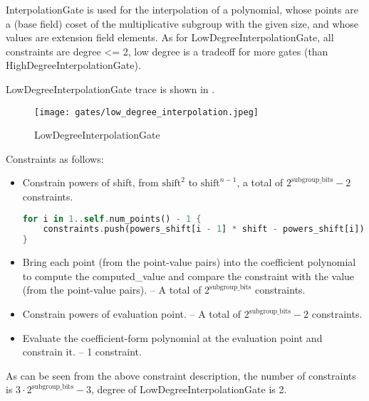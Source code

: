 
\hspace*{\fill}

\indent InterpolationGate is used for the interpolation of a polynomial, whose points are a (base field) coset of the multiplicative subgroup 
with the given size, and whose values are extension field elements. As for LowDegreeInterpolationGate,  all constraints are degree <= 2, 
low degree is a tradeoff for more gates (than HighDegreeInterpolationGate).

LowDegreeInterpolationGate trace is shown in .

\begin{figure}[!ht]
    \centering
    \texttt{[image: gates/low\_degree\_interpolation.jpeg]}
    \caption{LowDegreeInterpolationGate}
    \label{fig:low-degree-interpolation}
\end{figure}

Constraints as follows:
\begin{itemize}
    \item Constrain powers of shift, from $\text{shift}^2$ to $\text{shift}^{n-1}$, a total of $2^{\text{subgroup\_bits}}-2$ constraints.
    \begin{lstlisting}[language=rust]
for i in 1..self.num_points() - 1 {
    constraints.push(powers_shift[i - 1] * shift - powers_shift[i]);
}
    \end{lstlisting}
    \item Bring each point (from the point-value pairs) into the coefficient polynomial to compute the computed\_value 
    and compare the constraint with the value (from the point-value pairs). -- A total of $2^{\text{subgroup\_bits}}$ constraints.
    \item Constrain powers of evaluation point. -- A total of $2^{\text{subgroup\_bits}}-2$ constraints.
    \item Evaluate the coefficient-form polynomial at the evaluation point and constrain it. -- 1 constraint.
\end{itemize}

As can be seen from the above constraint description, the number of constraints is $3 \cdot 2^{\text{subgroup\_bits}}-3$, degree of LowDegreeInterpolationGate is 2.
